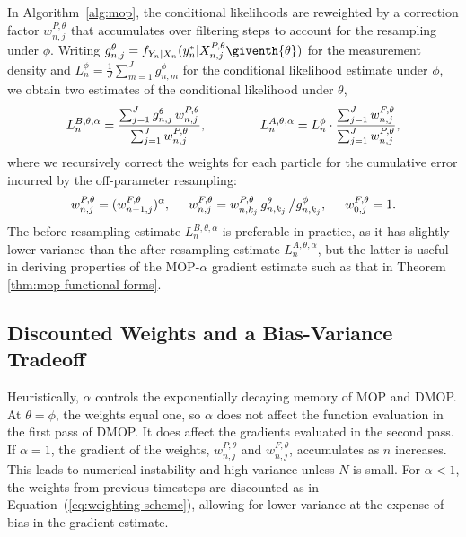 \documentclass[11pt]{article}
\newcommand\arxiv[2]{#1} %
\begin{document}
In Algorithm~\ref{alg:mop}, the conditional likelihoods are reweighted by a correction factor $w^{P,\theta}_{n,j}$ that accumulates over filtering steps to account for the resampling under $\phi$. 
Writing $g^{\theta}_{n,j}={f}_{{Y}_{n}|{X}_{n}}(y_{n}^{*}|{X}_{n,j}^{P,\theta}\giventh{\theta})$ for the measurement density and $L_n^{\phi} = \frac{1}{J}\sum_{m=1}^{J}g^{\phi}_{n,m}$ for the conditional likelihood estimate under $\phi$, we obtain two estimates of the conditional likelihood under $\theta$,
\begin{equation}
     \label{eq:mop-conditional-likelihood}
     L_n^{B,\theta,\alpha} = \frac{\sum_{j=1}^Jg^\theta_{n,j}\, w^{P,\theta}_{n,j}}{\sum_{j=1}^J  w^{P,\theta}_{n,j}}, \arxiv{\hspace{15mm}}{\;\;}
     L_n^{A,\theta,\alpha} = L_n^\phi\cdot \frac{\sum_{j=1}^J w^{F,\theta}_{n,j}}{\sum_{j=1}^J  w^{P,\theta}_{n,j}},
\end{equation}
where we recursively correct the weights for each particle for the cumulative error incurred by the off-parameter resampling:
\begin{equation}
    \label{eq:weighting-scheme}
    w_{n,j}^{P,\theta} = (w_{n-1,j}^{F,\theta})^\alpha, 
    \arxiv{\hspace{5mm}}{\;}
    w^{F,\theta}_{n,j} = w^{P,\theta}_{n,k_j} \, g^{\theta}_{n,k_j} \, \big/ g^{\phi}_{n,k_j}, 
    \arxiv{\hspace{5mm}}{\;}
    w^{F,\theta}_{0,j}= 1.
\end{equation}
The before-resampling estimate $L_n^{B,\theta,\alpha}$ is preferable in practice, as it has slightly lower variance than the after-resampling estimate $L_n^{A,\theta,\alpha}$, but the latter is useful in deriving properties of the MOP-$\alpha$ gradient estimate such as that in Theorem \ref{thm:mop-functional-forms}.


\subsection{Discounted Weights and a Bias-Variance Tradeoff}

Heuristically, $\alpha$ controls the exponentially decaying memory of MOP and DMOP.
At $\theta=\phi$, the weights equal one, so $\alpha$ does not affect the function evaluation in the first pass of DMOP. It does affect the gradients evaluated in the second pass.
If $\alpha=1$, the gradient of the weights, $w^{P,\theta}_{n,j}$ and $w^{F,\theta}_{n,j}$, accumulates as $n$ increases.
This leads to numerical instability and high variance unless $N$ is small.
For $\alpha<1$, the weights from previous timesteps are discounted as in Equation~(\ref{eq:weighting-scheme}), allowing for lower variance at the expense of bias in the gradient estimate.
\end{document}
